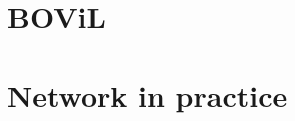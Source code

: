 \documentclass[11pt, oneside]{book} %
\begin{document}
\begin{appendix}
\chapter{BOViL} \label{chap:c6_bovil}


\chapter{Network in practice} \label{chap:c6_network}

\end{appendix}

\listoffigures{}

\end{document}
